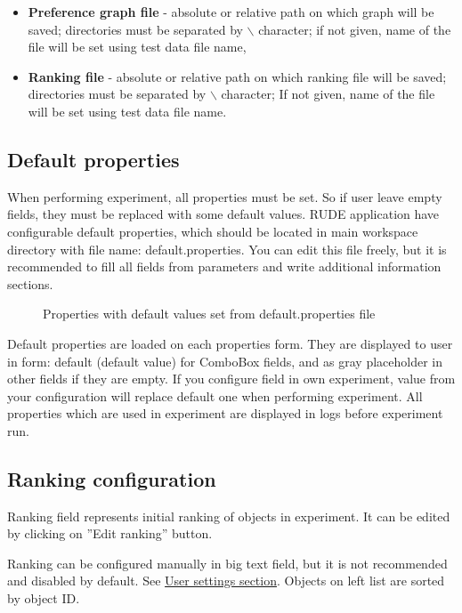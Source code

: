 \begin{itemize}
	\item \textbf{Preference graph file} - absolute or relative path on which graph will be saved; directories must be separated by $\backslash$ character; if not given, name of the file will be set using test data file name,
	\item \textbf{Ranking file} - absolute or relative path on which ranking file will be saved; directories must be separated by $\backslash$ character; If not given, name of the file will be set using test data file name.
\end{itemize}

\subsection{Default properties}\label{sub:properties-default}

When performing experiment, all properties must be set. So if user leave empty fields, they must be replaced with some default values. RUDE application have configurable default properties, which should be located in main workspace directory with file name: default.properties. You can edit this file freely, but it is recommended to fill all fields from parameters and write additional information sections.

\begin{figure*}[!ht] 
	\centering
	\caption{Properties with default values set from default.properties file}
\end{figure*}

Default properties are loaded on each properties form. They are displayed to user in form: default (default value) for ComboBox fields, and as gray placeholder in other fields if they are empty. If you configure field in own experiment, value from your configuration will replace default one when performing experiment. All properties which are used in experiment are displayed in logs before experiment run.


\subsection{Ranking configuration}\label{sub:properties-ranking}

Ranking field represents initial ranking of objects in experiment. It can be edited by clicking on ''Edit ranking'' button.

Ranking can be configured manually in big text field, but it is not recommended and disabled by default. See \hyperref[section:user-settings]{User settings section}. Objects on left list are sorted by object ID.


